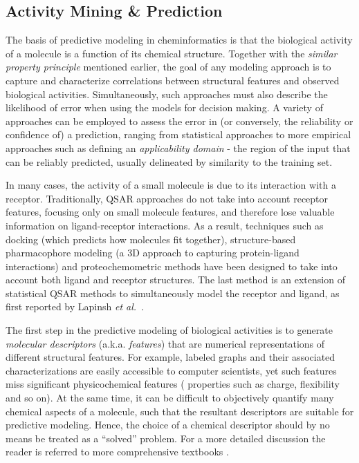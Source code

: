 \documentclass{../sig-alternate}
\begin{document}
\subsection{Activity Mining \& Prediction}
\label{sec:activity-mining}


The basis of predictive modeling in cheminformatics is that the
biological activity of a molecule is a function of its chemical
structure. Together with the \emph{similar property principle}
\cite{Johnson:1990qf} mentioned earlier, 
the goal of any modeling approach is to capture
and characterize correlations between structural features and
observed biological activities. Simultaneously, such approaches must
also describe the likelihood of error when using the
models for decision making.  A variety of approaches can be employed
to assess the error in (or conversely, the reliability or confidence of) a
prediction, ranging from statistical approaches to more
empirical approaches such as defining an \emph{applicability domain} -
the region of the input that can be
reliably predicted, usually delineated by similarity
to the training set.

In many cases, the activity of a small molecule is due to its
interaction with a receptor. Traditionally, QSAR \cite{Hansch:1962vn,
 Free:1964ys} approaches do not take into account receptor features,
focusing only on small molecule features, and therefore lose valuable
information on ligand-receptor interactions. As a result, techniques
such as docking (which predicts how molecules fit together),
structure-based pharmacophore modeling (a 3D approach to capturing protein-ligand
interactions) and proteochemometric methods have been designed to take
into account both ligand and receptor structures. The last method is
an extension of statistical QSAR methods to simultaneously
model the receptor and ligand, as first reported by Lapinsh \textit{et
 al.}~\cite{lapinsh2001}.

The first step in the predictive modeling of biological activities is
to generate \emph{molecular descriptors} (a.k.a. \emph{features}) that
are numerical representations of different structural features. For
example, labeled graphs and their associated
characterizations are easily accessible to computer scientists, yet
such features miss significant physicochemical features (
properties such as charge, flexibility and so on). At the same time,
it can be difficult to objectively quantify many chemical aspects of a
molecule, such that the resultant descriptors are suitable for
predictive modeling.  Hence, the choice of a chemical descriptor
should by no means be treated as a ``solved'' problem. For a more
detailed discussion the reader is referred to more comprehensive
textbooks \cite{todeschini2000,faulon2010}.
\end{document}
